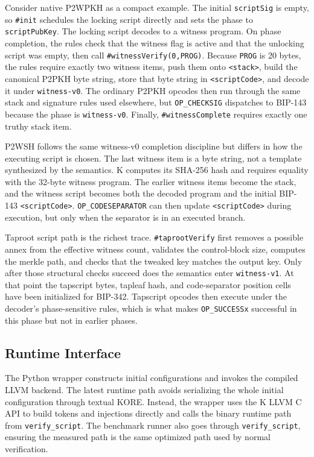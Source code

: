 \documentclass[conference]{IEEEtran}
\newcommand{\kcell}[1]{\texttt{<#1>}\xspace}
\begin{document}
Consider native P2WPKH as a compact example.  The initial \texttt{scriptSig}
is empty, so \texttt{\#init} schedules the locking script directly and sets the
phase to \texttt{scriptPubKey}.  The locking script decodes to a witness
program.  On phase completion, the rules check that the witness flag is active
and that the unlocking script was empty, then call
\texttt{\#witnessVerify(0,PROG)}.  Because \texttt{PROG} is 20 bytes, the
rules require exactly two witness items, push them onto \kcell{stack}, build
the canonical P2PKH byte string, store that byte string in \kcell{scriptCode},
and decode it under \texttt{witness-v0}.  The ordinary P2PKH opcodes then run
through the same stack and signature rules used elsewhere, but
\texttt{OP\_CHECKSIG} dispatches to BIP-143 because the phase is
\texttt{witness-v0}.  Finally, \texttt{\#witnessComplete} requires exactly one
truthy stack item.

P2WSH follows the same witness-v0 completion discipline but differs in how the
executing script is chosen.  The last witness item is a byte string, not a
template synthesized by the semantics.  K computes its SHA-256 hash and
requires equality with the 32-byte witness program.  The earlier witness items
become the stack, and the witness script becomes both the decoded program and
the initial BIP-143 \kcell{scriptCode}.  \texttt{OP\_CODESEPARATOR} can then
update \kcell{scriptCode} during execution, but only when the separator is in
an executed branch.

Taproot script path is the richest trace.  \texttt{\#taprootVerify} first
removes a possible annex from the effective witness count, validates the
control-block size, computes the merkle path, and checks that the tweaked key
matches the output key.  Only after those structural checks succeed does the
semantics enter \texttt{witness-v1}.  At that point the tapscript bytes,
tapleaf hash, and code-separator position cells have been initialized for
BIP-342.  Tapscript opcodes then execute under the decoder's phase-sensitive
rules, which is what makes \texttt{OP\_SUCCESSx} successful in this phase but
not in earlier phases.

\subsection{Runtime Interface}

The Python wrapper constructs initial configurations and invokes the compiled
LLVM backend.  The latest runtime path avoids serializing the whole initial
configuration through textual KORE.  Instead, the wrapper uses the K LLVM C API
to build tokens and injections directly and calls the binary runtime path from
\texttt{verify\_script}.  The benchmark runner also goes through
\texttt{verify\_script}, ensuring the measured path is the same optimized path
used by normal verification.
\end{document}
